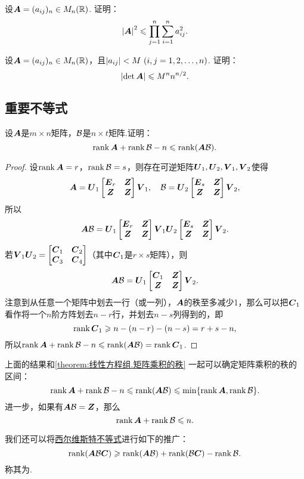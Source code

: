 \begin{example}
设\(\boldsymbol{A} = (a_{ij})_n \in M_n(\mathbb{R})\).
证明：\begin{equation}\label{equation:线性方程组.Hadamard不等式}
\abs{\boldsymbol{A}}^2 \leqslant \prod\limits_{j=1}^n \sum\limits_{i=1}^n a_{ij}^2.
\end{equation}
\end{example}

\begin{example}
设\(\boldsymbol{A} = (a_{ij})_n \in M_n(\mathbb{R})\)，且\(\abs{a_{ij}} < M\ (i,j=1,2,\dotsc,n)\).
证明：\begin{equation}
\abs{\det\boldsymbol{A}} \leqslant M^n n^{n/2}.
\end{equation}
\end{example}

\subsection{重要不等式}
\begin{theorem}[西尔维斯特不等式]
设\(\boldsymbol{A}\)是\(m \times n\)矩阵，\(\mathcal{B}\)是\(n \times t\)矩阵.证明：\begin{equation}\label{equation:线性方程组.西尔维斯特不等式}
\rank\boldsymbol{A} + \rank\mathcal{B} - n \leqslant \rank(\boldsymbol{A} \mathcal{B}).
\end{equation}
\begin{proof}
\def\AA{\P_1 \begin{bmatrix} \E_r & \z \\ \z & \z \end{bmatrix} \Q_1}
\def\BB{\P_2 \begin{bmatrix} \E_s & \z \\ \z & \z \end{bmatrix} \Q_2}
\def\CC#1{\C_{#1}}
设\(\rank\boldsymbol{A} = r\)，\(\rank\mathcal{B} = s\)，则存在可逆矩阵\(\P_1,\P_2,\Q_1,\Q_2\)使得\[
\A = \AA,
\quad
\B = \BB,
\]所以\[
\A \B = \AA \BB.
\]若\(\Q_1 \P_2 = \begin{bmatrix} \CC1 & \CC2 \\ \CC3 & \CC4 \end{bmatrix}\)（其中\(\CC1\)是\(r \times s\)矩阵），则\[
\A \B = \P_1 \begin{bmatrix} \CC1 & \z \\ \z & \z \end{bmatrix} \Q_2.
\]
注意到从任意一个矩阵中划去一行（或一列），\(\boldsymbol{A}\)的秩至多减少1，那么可以把\(\CC1\)看作将一个\(n\)阶方阵划去\(n-r\)行，并划去\(n-s\)列得到的，即\[
\rank\CC1 \geqslant n - (n-r) - (n-s) = r+s-n,
\]所以\(\rank\A + \rank\B - n \leqslant \rank(\A \B) = \rank\CC1\).
\end{proof}
\end{theorem}

上面的结果和\cref{theorem:线性方程组.矩阵乘积的秩} 一起可以确定矩阵乘积的秩的区间：\[
\rank\boldsymbol{A} + \rank\mathcal{B} - n \leqslant \rank(\boldsymbol{A}\mathcal{B}) \leqslant \min\{\rank\boldsymbol{A},\rank\mathcal{B}\}.
\]
进一步，如果有\(\boldsymbol{A}\mathcal{B}=\boldsymbol{Z}\)，那么\[
\rank\boldsymbol{A} + \rank\mathcal{B} \leqslant n.
\]

我们还可以将\hyperref[equation:线性方程组.西尔维斯特不等式]{西尔维斯特不等式}进行如下的推广：\begin{equation}\label{equation:线性方程组.弗罗贝尼乌斯不等式}
\rank(\boldsymbol{A}\mathcal{B}\boldsymbol{C}) \geqslant \rank(\boldsymbol{A}\mathcal{B}) + \rank(\mathcal{B}\boldsymbol{C}) - \rank\mathcal{B}.
\end{equation}称其为.
